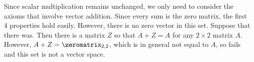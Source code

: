 %
Since scalar multiplication remains unchanged, we only need to consider the axioms that involve vector addition.  Since every sum is the zero matrix, the first 4 properties hold easily.  However, there is no zero vector in this set.  Suppose that there was.  Then there is a matrix $Z$ so that $A + Z = A$ for any $2\times 2$ matrix $A$.  However, $A + Z = \zeromatrix_{2,2}$, which is in general not equal to $A$, so  fails and this set is not a vector space.